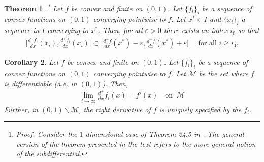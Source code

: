 \documentclass[10pt,a4paper]{amsart}
\newtheorem{thm}{Theorem}[section]
\newtheorem{cor}[thm]{Corollary}
\newtheorem{prop}[thm]{Proposition}
\numberwithin{equation}{section}
\begin{document}
    
    \begin{thm} \!\!\!\! \footnote{\textit{Proof.} Consider the $1$-dimensional case of Theorem 24.5 in \cite{Rockafellar}. The general version of the theorem presented in the text refers to the more general notion of the \textit{subdifferential}.}
        Let $f$ be convex and finite on $(0,1)$. Let $\{f_i\}_i$ be a sequence of convex functions on $(0,1)$ converging pointwise to $f$. Let $x^*\in I$ and $\{x_i\}_i$ a sequence in $I$ converging to $x^*$. Then, for all $\varepsilon>0$ there exists an index $i_0$ so that 
        \begin{align*}
            \Big[\frac{d^- f_i}{dx}(x_i),\frac{d^+ f_i}{dx}(x_i)\Big] \subset \Big[\frac{d^- f}{dx}(x^*)-\varepsilon,\frac{d^+ f}{dx}(x^*)+\varepsilon\Big] \quad \text{ for all }i\geq i_0. 
        \end{align*}
    \end{thm}
    \begin{cor}\label{DerivSwap}
        Let $f$ be convex and finite on $(0,1)$. Let $\{f_i\}_i$ be a sequence of convex functions on $(0,1)$ converging pointwise to $f$. Let $\mathcal{M}$ be the set where $f$ is differentiable (a.e. in $(0,1)$). Then, 
        \begin{align*}
            \lim_{i\to\infty} \frac{d^+}{dx}f_i(x)=f'(x) \quad \text{on } \ \mathcal{M}
        \end{align*}    
        Further, in $(0,1)\backslash \mathcal{M}$, the right derivative of $f$ is uniquely specified by the $f_i$.
    \end{cor}
\end{document}
